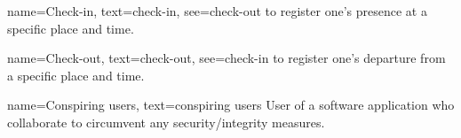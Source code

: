 {
  name={Check-in},
  text={check-in},
  see={check-out}
}
{
  to register one's presence at a specific place and time.
}

{
  name={Check-out},
  text={check-out},
  see={check-in}
}
{
  to register one's departure from a specific place and
  time.
}

{
  name={Conspiring users},
  text={conspiring users}
}
{
  User of a software application who collaborate to
  circumvent any security/integrity measures.
}